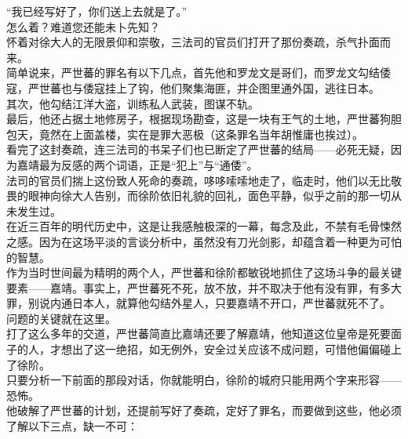 \begin{multicols}{\theparacolNo}
“我已经写好了，你们送上去就是了。”\\

怎么着？难道您还能未卜先知？\\

怀着对徐大人的无限景仰和崇敬，三法司的官员们打开了那份奏疏，杀气扑面而来。\\

简单说来，严世蕃的罪名有以下几点，首先他和罗龙文是哥们，而罗龙文勾结倭寇，严世蕃也与倭寇挂上了钩，他们聚集海匪，并企图里通外国，逃往日本。\\

其次，他勾结江洋大盗，训练私人武装，图谋不轨。\\

最后，他还占据土地修房子，根据现场勘查，这是一块有王气的土地，严世蕃狗胆包天，竟然在上面盖楼，实在是罪大恶极（这条罪名当年胡惟庸也挨过）。\\

看完了这封奏疏，连三法司的书呆子们也已断定了严世蕃的结局——必死无疑，因为嘉靖最为反感的两个词语，正是“犯上”与“通倭”。\\

法司的官员们揣上这份致人死命的奏疏，哆哆嗦嗦地走了，临走时，他们以无比敬畏的眼神向徐大人告别，而徐阶依旧礼貌的回礼，面色平静，似乎之前的那一切从未发生过。\\

在近三百年的明代历史中，这是让我感触极深的一幕，每念及此，不禁有毛骨悚然之感。因为在这场平淡的言谈分析中，虽然没有刀光剑影，却蕴含着一种更为可怕的智慧。\\

作为当时世间最为精明的两个人，严世蕃和徐阶都敏锐地抓住了这场斗争的最关键要素——嘉靖。事实上，严世蕃死不死，放不放，并不取决于他有没有罪，有多大罪，别说内通日本人，就算他勾结外星人，只要嘉靖不开口，严世蕃就死不了。\\

问题的关键就在这里。\\

打了这么多年的交道，严世蕃简直比嘉靖还要了解嘉靖，他知道这位皇帝是死要面子的人，才想出了这一绝招，如无例外，安全过关应该不成问题，可惜他偏偏碰上了徐阶。\\

只要分析一下前面的那段对话，你就能明白，徐阶的城府只能用两个字来形容——恐怖。\\

他破解了严世蕃的计划，还提前写好了奏疏，定好了罪名，而要做到这些，他必须了解以下三点，缺一不可：\\


\end{multicols}
